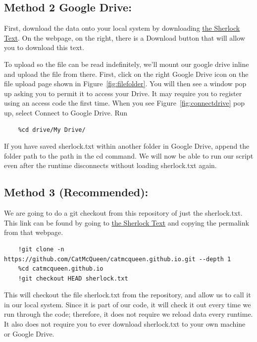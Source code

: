 \documentclass{article}
\begin{document}
\subsection{Method 2 Google Drive:}

First, download the data onto your local system by downloading 
\href{https://github.com/CatMcQueen/catmcqueen.github.io/blob/b67a282c9be6bfd1ed17796c2507b9108cffb6bc/sherlock.txt}{the Sherlock Text}. On the webpage, on the right, there is a Download button that will allow you to download this text.

To upload so the file can be read indefinitely, we'll mount our google drive inline and upload the file from there. First, click on the right Google Drive icon on the file upload page shown in Figure~\ref{fig:filefolder}. You will then see a window pop up asking you to permit it to access your Drive. It may require you to register using an access code the first time. When you see Figure~\ref{fig:connectdrive} pop up, select Connect to Google Drive. Run

\begin{verbatim}
    %cd drive/My Drive/
\end{verbatim}

If you have saved sherlock.txt within another folder in Google Drive, append the folder path to the path in the cd command. We will now be able to run our script even after the runtime disconnects without loading sherlock.txt again.

\subsection{Method 3 (Recommended):}

We are going to do a git checkout from this repository of just the sherlock.txt. This link can be found by going to \href{https://github.com/CatMcQueen/catmcqueen.github.io/blob/main/sherlock.txt}{the Sherlock Text} and copying the permalink from that webpage.

\begin{verbatim}
    !git clone -n https://github.com/CatMcQueen/catmcqueen.github.io.git --depth 1
    %cd catmcqueen.github.io
    !git checkout HEAD sherlock.txt
\end{verbatim}

This will checkout the file sherlock.txt from the repository, and allow us to call it in our local system. Since it is part of our code, it will check it out every time we run through the code; therefore, it does not require we reload data every runtime. It also does not require you to ever download sherlock.txt to your own machine or Google Drive.  
\end{document}
